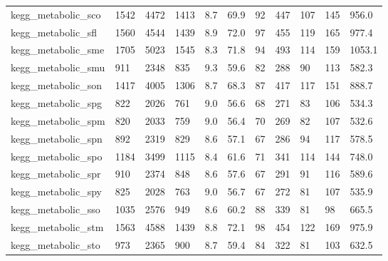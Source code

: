 \begin{longtable}{lllllllllll}
 kegg\_metabolic\_sco                                 & 1542       & 4472      & 1413  & 8.7    & 69.9   & 92    & 447    & 107    & 145    & 956.0   \\
 kegg\_metabolic\_sfl                                 & 1560       & 4544      & 1439  & 8.9    & 72.0   & 97    & 455    & 119    & 165    & 977.4   \\
 kegg\_metabolic\_sme                                 & 1705       & 5023      & 1545  & 8.3    & 71.8   & 94    & 493    & 114    & 159    & 1053.1  \\
 kegg\_metabolic\_smu                                 & 911        & 2348      & 835   & 9.3    & 59.6   & 82    & 288    & 90     & 113    & 582.3   \\
 kegg\_metabolic\_son                                 & 1417       & 4005      & 1306  & 8.7    & 68.3   & 87    & 417    & 117    & 151    & 888.7   \\
 kegg\_metabolic\_spg                                 & 822        & 2026      & 761   & 9.0    & 56.6   & 68    & 271    & 83     & 106    & 534.3   \\
 kegg\_metabolic\_spm                                 & 820        & 2033      & 759   & 9.0    & 56.4   & 70    & 269    & 82     & 107    & 532.6   \\
 kegg\_metabolic\_spn                                 & 892        & 2319      & 829   & 8.6    & 57.1   & 67    & 286    & 94     & 117    & 578.5   \\
 kegg\_metabolic\_spo                                 & 1184       & 3499      & 1115  & 8.4    & 61.6   & 71    & 341    & 114    & 144    & 748.0   \\
 kegg\_metabolic\_spr                                 & 910        & 2374      & 848   & 8.6    & 57.6   & 67    & 291    & 91     & 116    & 589.6   \\
 kegg\_metabolic\_spy                                 & 825        & 2028      & 763   & 9.0    & 56.7   & 67    & 272    & 81     & 107    & 535.9   \\
 kegg\_metabolic\_sso                                 & 1035       & 2576      & 949   & 8.6    & 60.2   & 88    & 339    & 81     & 98     & 665.5   \\
 kegg\_metabolic\_stm                                 & 1563       & 4588      & 1439  & 8.8    & 72.1   & 98    & 454    & 122    & 169    & 975.9   \\
 kegg\_metabolic\_sto                                 & 973        & 2365      & 900   & 8.7    & 59.4   & 84    & 322    & 81     & 103    & 632.5   \\

\end{longtable}
